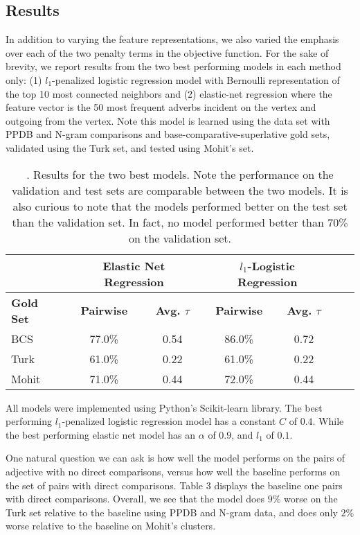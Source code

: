 \subsection{Results}

In addition to varying the feature representations, we also varied the emphasis over each of the two penalty terms in the objective function. For the sake of brevity, we report results from the two best performing models in each method only: (1) $l_1$-penalized logistic regression model with Bernoulli representation of the top 10 most connected neighbors and (2) elastic-net regression where the feature vector is the 50 most frequent adverbs incident on the vertex and outgoing from the vertex. Note this model is learned using the data set with PPDB and N-gram comparisons and base-comparative-superlative gold sets, validated using the Turk set, and tested using Mohit's set.

\begin{table}
\small
\centering
\begin{tabular}{|l|cc|cc|cc|}
	\hline 
	& \multicolumn{2}{c|}{Elastic Net Regression } 
	& \multicolumn{2}{c|}{$l_1$-Logistic Regression} \\
	\hline 
	\bf Gold Set
	& \bf Pairwise & \bf Avg. $\tau$  
	& \bf Pairwise & \bf Avg. $\tau$  \\ 
	\hline
	BCS   & 77.0\% & 0.54 & 86.0\%  &  0.72 \\
	Turk  & 61.0\% & 0.22 & 61.0\%  &  0.22 \\
	Mohit & 71.0\% & 0.44 & 72.0\%  &  0.44 \\
	\hline
\end{tabular}
\caption{\label{font-table}. Results for the two best models. Note the performance on the validation and test sets are comparable between the two models. It is also curious to note that the models performed better on the test set than the validation set. In fact, no model performed better than $70\%$ on the validation set. }
\end{table}

All models were implemented using Python's Scikit-learn library. The best performing $l_1$-penalized logistic regression model has a constant $C$ of $0.4$. While the best performing elastic net model has an $\alpha$ of $0.9$, and $l_1$ of $0.1$. 

One natural question we can ask is how well the model performs on the pairs of adjective with no direct comparisons, versus how well the baseline performs on the set of pairs with direct comparisons. Table 3 displays the baseline one pairs with direct comparisons. Overall, we see that the model does $9\%$ worse on the Turk set relative to the baseline using PPDB and N-gram data, and does only $2\%$ worse relative to the baseline on Mohit's clusters.



